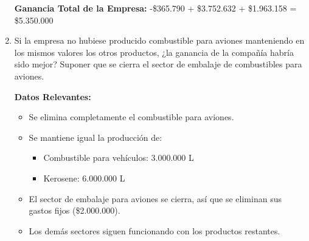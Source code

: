 \documentclass[10pt,a4paper]{article}
\begin{document}
\begin{enumerate}
    \begin{center}
    \end{center}

    \vspace{0.5em}

    \textbf{Ganancia Total de la Empresa: } -\$365.790 + \$3.752.632 + \$1.963.158 = \$5.350.000

    \item Si la empresa no hubiese producido combustible para aviones manteniendo en los mismos valores los otros
    productos, ¿la ganancia de la compañía habría sido mejor? Suponer que se cierra el sector de embalaje de
    combustibles para aviones. 

    \vspace{0.5em}

    \textbf{Datos Relevantes:}

    \begin{itemize}

        \item Se elimina completamente el combustible para aviones.
        \item Se mantiene igual la producción de:
        
        \begin{itemize}

            \item Combustible para vehículos: 3.000.000 L
            \item Kerosene: 6.000.000 L
    
        \end{itemize}

        \item El sector de embalaje para aviones se cierra, así que se eliminan sus gastos fijos (\$2.000.000).
        \item Los demás sectores siguen funcionando con los productos restantes. \\


\end{itemize}
\end{enumerate}
\end{document}

